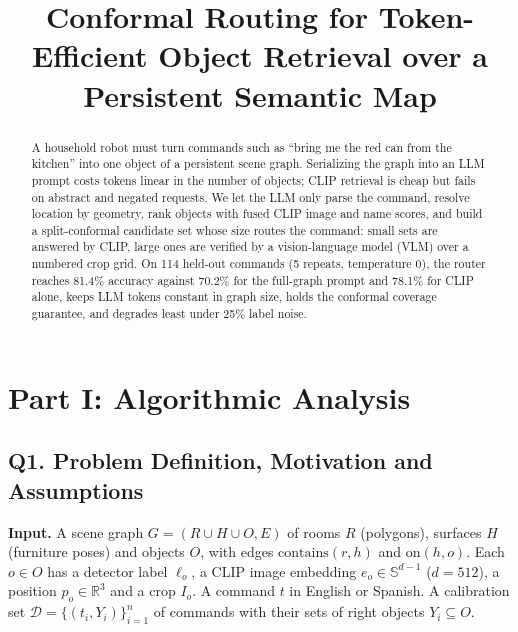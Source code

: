 \documentclass[conference]{IEEEtran}
\begin{document}
\title{Conformal Routing for Token-Efficient Object Retrieval over a Persistent Semantic Map}

\author{
}

\maketitle

\begin{abstract}
A household robot must turn commands such as ``bring me the red can from the kitchen'' into one object of a
persistent scene graph. Serializing the graph into an LLM prompt costs tokens linear in the number of objects;
CLIP retrieval is cheap but fails on abstract and negated requests. We let the LLM only parse the command,
resolve location by geometry, rank objects with fused CLIP image and name scores, and build a split-conformal
candidate set whose size routes the command: small sets are answered by CLIP, large ones are verified by a
vision-language model (VLM) over a numbered crop grid. On 114 held-out commands (5 repeats, temperature 0),
the router reaches 81.4\% accuracy against 70.2\% for the full-graph prompt and 78.1\% for CLIP alone, keeps
LLM tokens constant in graph size, holds the conformal coverage guarantee, and degrades least under 25\% label noise.
\end{abstract}

\section{Part I: Algorithmic Analysis}

\subsection{Q1. Problem Definition, Motivation and Assumptions}
\textbf{Input.} A scene graph $G=(R\cup H\cup O, E)$ of rooms $R$ (polygons), surfaces $H$ (furniture poses)
and objects $O$, with edges $\mathrm{contains}(r,h)$ and $\mathrm{on}(h,o)$. Each $o\in O$ has a detector
label $\ell_o$, a CLIP image embedding $e_o\in\mathbb{S}^{d-1}$ ($d=512$), a position $p_o\in\mathbb{R}^3$ and a crop
$I_o$. A command $t$ in English or Spanish. A calibration set $\mathcal{D}=\{(t_i,Y_i)\}_{i=1}^n$ of commands with
their sets of right objects $Y_i\subseteq O$.
\end{document}
